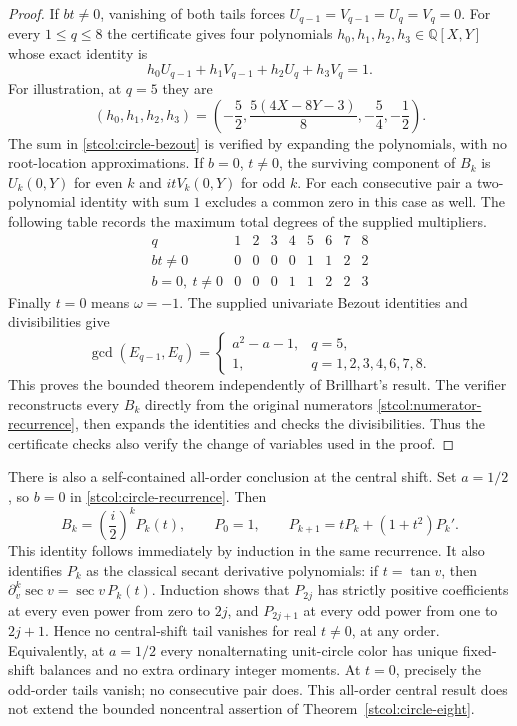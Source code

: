 \begin{proof}
If $bt\ne0$, vanishing of both tails forces
$U_{q-1}=V_{q-1}=U_q=V_q=0$.  For every $1\le q\le8$ the
certificate gives four polynomials $h_0,h_1,h_2,h_3\in\mathbb Q[X,Y]$
whose exact identity is
\begin{equation}\label{stcol:circle-bezout}
 h_0U_{q-1}+h_1V_{q-1}+h_2U_q+h_3V_q=1.
\end{equation}
For illustration, at $q=5$ they are
\[
 (h_0,h_1,h_2,h_3)
   =\left(-\frac52,\frac{5(4X-8Y-3)}8,-\frac54,-\frac12\right).
\]
The sum in \eqref{stcol:circle-bezout} is verified by expanding
the polynomials, with no root-location approximations.
If $b=0$, $t\ne0$, the surviving component of $B_k$ is
$U_k(0,Y)$ for even $k$ and $itV_k(0,Y)$ for odd $k$.
For each consecutive pair a two-polynomial identity with sum $1$
excludes a common zero in this case as well.  The following table
records the maximum total degrees of the supplied multipliers.
\[
\begin{array}{c|rrrrrrrr}
 q&1&2&3&4&5&6&7&8\\\hline
 bt\ne0&0&0&0&0&1&1&2&2\\
 b=0,\ t\ne0&0&0&0&1&1&2&2&3
\end{array}
\]
Finally $t=0$ means $\omega=-1$.  The supplied univariate Bezout
identities and divisibilities give
\[
 \gcd(E_{q-1},E_q)=
 \begin{cases}a^2-a-1,&q=5,\\1,&q=1,2,3,4,6,7,8.\end{cases}
\]
This proves the bounded theorem independently of Brillhart's result.
The verifier reconstructs every $B_k$ directly from the original
numerators \eqref{stcol:numerator-recurrence}, then expands the
identities and checks the divisibilities.  Thus the certificate checks
also verify the change of variables used in the proof.
\end{proof}

There is also a self-contained all-order conclusion at the central shift.
Set $a=1/2$, so $b=0$ in \eqref{stcol:circle-recurrence}.  Then
\begin{equation}\label{stcol:central-polynomials}
 B_k=\left(\frac i2\right)^k P_k(t),\qquad
 P_0=1,\qquad P_{k+1}=tP_k+(1+t^2)P_k'.
\end{equation}
This identity follows immediately by induction in the same recurrence.
It also identifies $P_k$ as the classical secant derivative polynomials:
if $t=\tan v$, then
$\partial_v^k\sec v=\sec v\,P_k(t)$.
Induction shows that $P_{2j}$ has strictly positive coefficients at every
even power from zero to $2j$, and $P_{2j+1}$ at every odd power from one
to $2j+1$.  Hence no central-shift tail vanishes for real $t\ne0$,
at any order.  Equivalently, at $a=1/2$ every nonalternating unit-circle
color has unique fixed-shift balances and no extra ordinary integer
moments.  At $t=0$, precisely the odd-order tails vanish; no consecutive
pair does.  This all-order central result does not extend the bounded
noncentral assertion of Theorem~\ref{stcol:circle-eight}.

